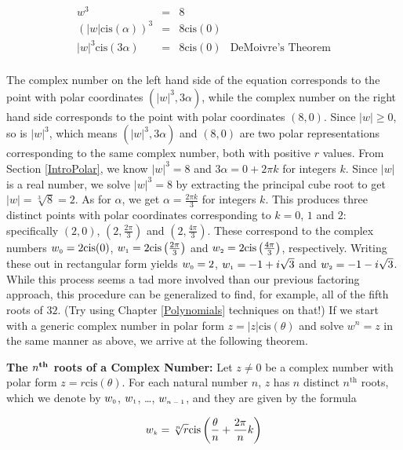 \[ \begin{array}{rcll}

w^3 & = & 8 & \\[3pt]
\left(|w| \text{cis}(\alpha)\right)^3 & = & 8 \text{cis}(0) & \\[3pt]
|w|^3 \text{cis}(3\alpha) & = & 8 \text{cis}(0) & \text{DeMoivre's Theorem} \\[3pt]

\end{array}\]

The complex number on the left hand side of the equation corresponds to the point with polar coordinates $\left(|w|^3, 3\alpha\right)$,   while the complex number on the right hand side corresponds to the point with polar coordinates $(8,0)$.  Since $|w| \geq 0$, so is $|w|^3$, which means  $\left(|w|^3, 3\alpha\right)$ and $(8,0)$ are two polar representations corresponding to the same complex number, both with positive $r$ values.  From Section \ref{IntroPolar}, we know $|w|^3 = 8$ and $3\alpha = 0 + 2\pi k$ for integers $k$.  Since $|w|$ is a real number, we solve $|w|^3 = 8$ by extracting the principal cube root to get  $|w| = \sqrt[3]{8} = 2$.  As for $\alpha$, we get  $\alpha = \frac{2\pi k}{3}$ for integers $k$.  This produces three distinct points with polar coordinates corresponding to $k = 0$, $1$ and $2$: specifically $(2,0)$, $\left(2, \frac{2\pi}{3}\right)$ and $\left(2, \frac{4\pi}{3}\right)$.  These correspond to the complex numbers  $w_{\text{\tiny $0$}} = 2 \text{cis}(0)$, $w_{\text{\tiny $1$}} = 2 \text{cis}\left(\frac{2\pi}{3}\right)$ and $w_{\text{\tiny $2$}} = 2 \text{cis}\left(\frac{4\pi}{3}\right)$, respectively.  Writing these out in rectangular form yields $w_{\text{\tiny $0$}} = 2$, $w_{\text{\tiny $1$}} = -1 + i\sqrt{3}$ and $w_{\text{\tiny $2$}} = -1-i\sqrt{3}$. While this process seems a tad more involved than our previous factoring approach, this procedure can be generalized to find, for example, all of the fifth roots of $32$. (Try using Chapter \ref{Polynomials} techniques on that!) If we start with a generic complex number in polar form $z = |z| \text{cis}(\theta)$ and solve $w^{n} = z$ in the same manner as above, we arrive at the following theorem.

\smallskip

\colorbox{ResultColor}{\bbm
\begin{thm} \label{nthrootscomplexthm} \textbf{The \boldmath $n^{\mbox{\textbf{\scriptsize th}}}$ roots of a Complex Number:} Let $z \neq 0$ be a complex number with polar form $z = r\text{cis}(\theta)$. For each natural number $n$, $z$ has $n$ distinct $n^{\text{th}}$ roots, which we denote by $w_{\text{\tiny$0$}}$, $w_{\text{\tiny$1$}}$, \ldots, $w_{\text{\tiny$n-1$}}$, and they are given by the formula   

\[ w_{\text{\tiny$k$}} = \sqrt[n]{r}\text{cis}\left(\frac{\theta}{n} + \frac{2\pi}{n} k \right) \]

\end{thm}
\ebm}

